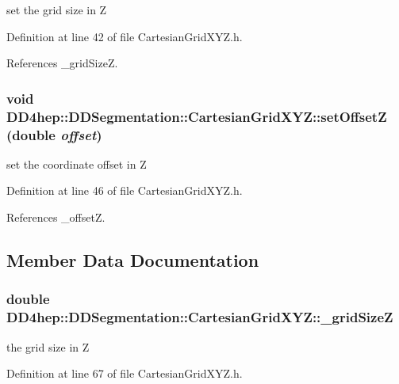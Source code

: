 set the grid size in Z 

Definition at line 42 of file CartesianGridXYZ.h.

References \_\-gridSizeZ.\hypertarget{class_d_d4hep_1_1_d_d_segmentation_1_1_cartesian_grid_x_y_z_a1026999b123d8140f6e710abf9977cef}{
\subsubsection[{setOffsetZ}]{\setlength{\rightskip}{0pt plus 5cm}void DD4hep::DDSegmentation::CartesianGridXYZ::setOffsetZ (double {\em offset})}}
\label{class_d_d4hep_1_1_d_d_segmentation_1_1_cartesian_grid_x_y_z_a1026999b123d8140f6e710abf9977cef}


set the coordinate offset in Z 

Definition at line 46 of file CartesianGridXYZ.h.

References \_\-offsetZ.

\subsection{Member Data Documentation}
\hypertarget{class_d_d4hep_1_1_d_d_segmentation_1_1_cartesian_grid_x_y_z_a9e67a94e0fb2dfa8d3343c95d9c04ad0}{
\subsubsection[{\_\-gridSizeZ}]{\setlength{\rightskip}{0pt plus 5cm}double {\bf DD4hep::DDSegmentation::CartesianGridXYZ::\_\-gridSizeZ}}}
\label{class_d_d4hep_1_1_d_d_segmentation_1_1_cartesian_grid_x_y_z_a9e67a94e0fb2dfa8d3343c95d9c04ad0}


the grid size in Z 

Definition at line 67 of file CartesianGridXYZ.h.

